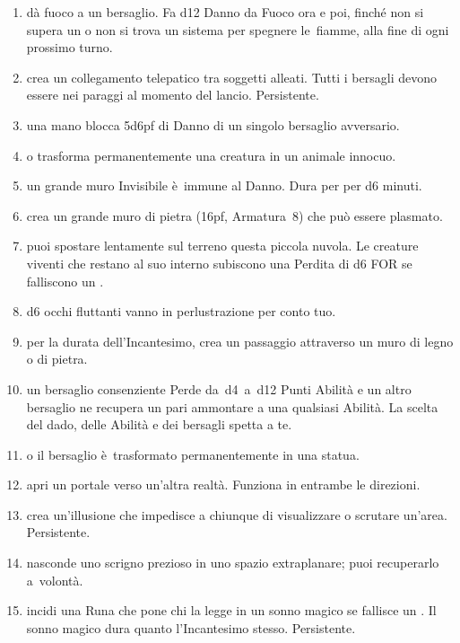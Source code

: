 \documentclass[itdr]{subfiles}
\begin{document}
\begin{enumerate}
	\item {} dà fuoco a un bersaglio. Fa d12 Danno da Fuoco ora e poi, finché non si supera un  o non si trova un sistema per spegnere le~fiamme, alla fine di ogni prossimo turno.
	\item {} crea un collegamento telepatico tra soggetti alleati. Tutti i bersagli devono essere nei paraggi al momento del lancio. \mbox{Persistente.}
	\item {} una mano blocca 5d6pf di Danno di un singolo bersaglio avversario.
	\item {}  o trasforma permanentemente una creatura in un animale innocuo.

\vfill
\break

	\item {} un grande muro Invisibile è~immune al Danno. Dura per per d6 minuti.
	\item {} crea un grande muro di pietra (16pf, Armatura~8) che può essere plasmato.
	\item {} puoi spostare lentamente sul terreno questa piccola nuvola. Le creature viventi che restano al suo interno subiscono una Perdita di d6 FOR se falliscono un .
	\item {} d6 occhi fluttanti vanno in perlustrazione per conto tuo.
	\item {} per la durata dell'Incantesimo, crea un passaggio attraverso un muro di legno o di pietra.
	\item {} un bersaglio consenziente Perde \mbox{da d4 a d12} Punti Abilità e un altro bersaglio ne recupera un pari ammontare a una qualsiasi Abilità. La scelta del dado, delle \mbox{Abilità} e dei bersagli spetta a te.
	\item {}  o il bersaglio è~trasformato permanentemente in una statua.
	\item {} apri un portale verso un'altra realtà. Funziona in entrambe le direzioni.
	\item {} crea un'illusione che impedisce a chiunque di visualizzare o scrutare un'area. Persistente.
	\item {} nasconde uno scrigno prezioso in uno spazio extraplanare; puoi recuperarlo a~volontà.
	\item {} incidi una Runa che pone chi la legge in un sonno magico se fallisce un . Il sonno magico dura quanto l'Incantesimo stesso. Persistente.

\end{enumerate}
\end{document}
